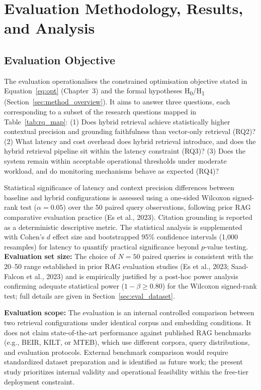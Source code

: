 \chapter{Evaluation Methodology, Results, and Analysis}
\label{ch:eval}

\section{Evaluation Objective}
\label{sec:eval_objective}

The evaluation operationalises the constrained optimisation objective stated in Equation~\ref{eq:opt} (Chapter~3) and the formal hypotheses H\textsubscript{0}/H\textsubscript{1} (Section~\ref{sec:method_overview}). It aims to answer three questions, each corresponding to a subset of the research questions mapped in Table~\ref{tab:rq_map}: (1) Does hybrid retrieval achieve statistically higher contextual precision and grounding faithfulness than vector-only retrieval (RQ2)? (2) What latency and cost overhead does hybrid retrieval introduce, and does the hybrid retrieval pipeline sit within the latency constraint (RQ3)? (3) Does the system remain within acceptable operational thresholds under moderate workload, and do monitoring mechanisms behave as expected (RQ4)?

Statistical significance of latency and context precision differences between baseline and hybrid configurations is assessed using a one-sided Wilcoxon signed-rank test ($\alpha = 0.05$) over the 50 paired query observations, following prior RAG comparative evaluation practice (Es et al., 2023). Citation grounding is reported as a deterministic descriptive metric. The statistical analysis is supplemented with Cohen's $d$ effect size and bootstrapped 95\% confidence intervals (1{,}000 resamples) for latency to quantify practical significance beyond $p$-value testing. \textbf{Evaluation set size:} The choice of $N = 50$ paired queries is consistent with the 20--50 range established in prior RAG evaluation studies (Es et al., 2023; Saad-Falcon et al., 2023) and is empirically justified by a post-hoc power analysis confirming adequate statistical power ($1 - \beta \geq 0.80$) for the Wilcoxon signed-rank test; full details are given in Section~\ref{sec:eval_dataset}.

\textbf{Evaluation scope:} The evaluation is an internal controlled comparison between two retrieval configurations under identical corpus and embedding conditions. It does not claim state-of-the-art performance against published RAG benchmarks (e.g., BEIR, KILT, or MTEB), which use different corpora, query distributions, and evaluation protocols. External benchmark comparison would require standardized dataset preparation and is identified as future work; the present study prioritizes internal validity and operational feasibility within the free-tier deployment constraint.

